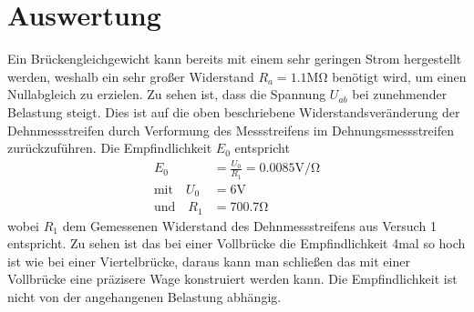 \newpage

\section[Auswertung]{Auswertung}
Ein Brückengleichgewicht kann bereits mit einem sehr geringen Strom
hergestellt werden, weshalb ein sehr großer Widerstand \( R_a = 1.1 \si{\mega\ohm} \) benötigt wird,
um einen Nullabgleich zu erzielen.
Zu sehen ist, dass die Spannung \( U_{ab} \) bei zunehmender Belastung steigt.
Dies ist auf die oben beschriebene Widerstandsveränderung
der Dehnmessstreifen durch Verformung des Messstreifens
im Dehnungsmessstreifen zurückzuführen.
Die Empfindlichkeit \( E_0 \) entspricht
\begin{align*}
    E_0 &= \frac{ U_0 }{ R_1 } = 0.0085 \si{\volt\per\ohm} \\
    \text{mit} \quad U_0 &= 6 \si{\volt} \\
    \text{und} \quad R_1 &= 700.7 \si{\ohm}
\end{align*}
wobei \( R_1 \) dem Gemessenen Widerstand des Dehnmessstreifens aus Versuch 1 entspricht.
Zu sehen ist das bei einer Vollbrücke die Empfindlichkeit 4mal so hoch ist wie bei einer Viertelbrücke, daraus kann man schließen das mit einer Vollbrücke eine präzisere Wage konstruiert werden kann.
Die Empfindlichkeit ist nicht von der angehangenen Belastung abhängig.